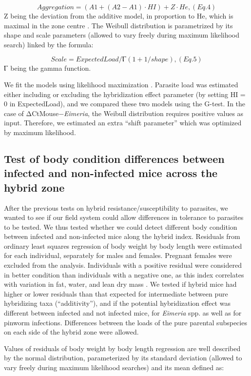 \[Aggregation = (A1 + (A2 − A1) · HI) + Z · He ,           (Eq. 4)\] 
Z being the deviation from the additive model, in proportion to He, which is maximal in the zone centre \citep{baird_where_2012}. The Weibull distribution is parametrized by its shape and scale parameters (allowed to vary freely during maximum likelihood search) linked by the formula:

\[Scale = ExpectedLoad / Ⲅ (1 + 1/ shape) ,           (Eq. 5)\]
Ⲅ  being the gamma function. 
\par We fit the models using likelihood maximization \parencite[using the R package mle2;][]{bolker_bbmle_2017}. Parasite load was estimated either including or excluding the hybridization effect parameter (by setting HI = 0 in ExpectedLoad), and we compared these two models using the G-test. In the case of ΔCtMouse−\textit{Eimeria}, the Weibull distribution requires positive values as input. Therefore, we estimated an extra “shift parameter” which was optimized by maximum likelihood.

\subsection{Test of body condition differences between infected and non-infected mice across the hybrid zone}
After the previous tests on hybrid resistance/susceptibility to parasites, we wanted to see if our field system could allow differences in tolerance to parasites to be tested. We thus tested whether we could detect different body condition between infected and non-infected mice along the hybrid index. Residuals from ordinary least squares regression of body weight by body length were estimated for each individual, separately for males and females. Pregnant females were excluded from the analysis. Individuals with a positive residual were considered in better condition than individuals with a negative one, as this index correlates with variation in fat, water, and lean dry mass \citep{schulte-hostedde_restitution_2005}. We tested if hybrid mice had higher or lower residuals than that expected for intermediate between pure hybridizing taxa (“additivity”), and if the potential hybridization effect was different between infected and not infected mice, for \textit{Eimeria} spp. as well as for pinworm infections. Differences between the loads of the pure parental subspecies on each side of the hybrid zone were allowed.
\par Values of residuals of body weight by body length regression are well described by the normal distribution, parameterized by its standard deviation (allowed to vary freely during maximum likelihood searches) and its mean defined as:

